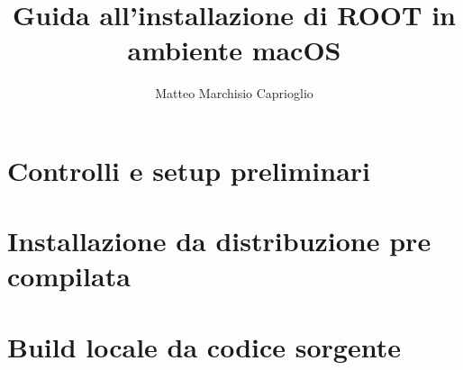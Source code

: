 \documentclass[]{article}
\title{\textbf{Guida all'installazione di ROOT in ambiente macOS}}
\author{Matteo Marchisio Caprioglio}
\begin{document}
\maketitle

\begin{abstract}
	
\end{abstract}

\newpage

\tableofcontents
\newpage

\section{Controlli e setup preliminari}
\label{sec:preliminari}


\section{Installazione da distribuzione pre compilata}
\label{sec:pre-comp}


\section{Build locale da codice sorgente}
\label{sec:build}



\newpage

\begin{comment}
\section{Documentazione}
\begin{itemize}
	\item \hyperref{https://root.cern}{}{}{Sito di ROOT - documentazione completa}
	\item \hyperref{https://root.cern/install/all_releases/}{}{}{Releases di ROOT}
	\item \hyperref{https://www.howtogeek.com/444596/how-to-change-the-default-shell-to-bash-in-macos-catalina/}{}{}{Come cambiare la shell di default di macOS}
	\item \hyperref{https://www.gnu.org/savannah-checkouts/gnu/bash/manual/bash.html#Controlling-the-Prompt}{}{}{Manuale comandi shell}
	\item \hyperref{https://wiki.gentoo.org/wiki/Vim/Guide}{}{}{Guida Vim}
\end{itemize}
\end{comment}



\end{document}
